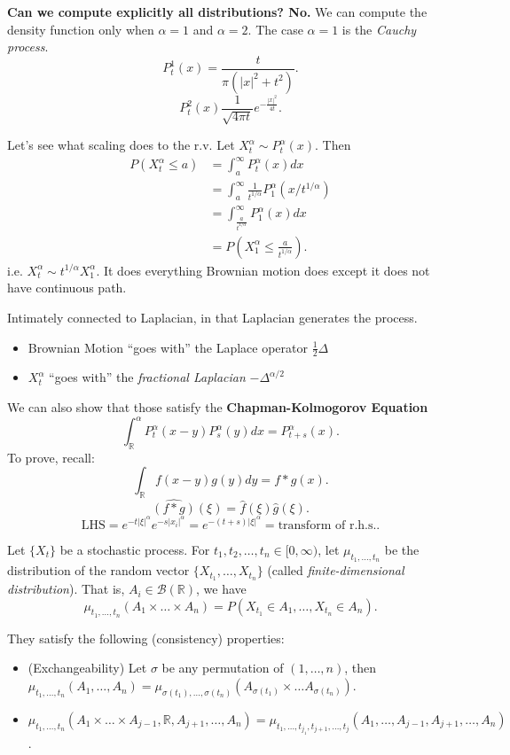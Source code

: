 \textbf{Can we compute explicitly all distributions? No.} We can compute the density function only when $\alpha = 1$ and $\alpha = 2$. The case $\alpha = 1$ is the \textit{Cauchy process}.
\[
	P_t^1 (x) = \frac{t}{\pi (|x|^2 + t^2)}
.\] 
\[
	P_t^2 (x) \frac{1}{\sqrt{4 \pi t} } e^{- \frac{|x|^2}{ 4 t}}
.\] 

Let's see what scaling does to the r.v.
Let $X_t^\alpha \sim P_t^\alpha(x)$. Then
\begin{align*}
	P\left( X_t^\alpha \le a \right) 
	&= \int_a^\infty P_t^\alpha(x) dx \\
	&= \int _a^\infty \frac{1}{t^{1 / \alpha}} P_1^\alpha \left( x / t^{1 / \alpha} \right)  \\
	&= \int _{\frac{a}{t^{1 / \alpha}}}^\infty P_1^\alpha (x) dx \\
	&= P(X_1^\alpha \le  \frac{a}{t^{1 / \alpha}})
.\end{align*}
i.e. $X_t^\alpha \sim t^{1 / \alpha} X_1^\alpha$. It does everything Brownian motion does except it does not have continuous path. 

Intimately connected to Laplacian, in that Laplacian generates the process.
\begin{itemize}
	\item Brownian Motion ``goes with'' the Laplace operator $\frac{1}{2} \Delta$
	\item $X_t^\alpha$ ``goes with'' the \textit{fractional Laplacian} $- \Delta^{\alpha / 2}$
\end{itemize}

We can also show that those satisfy the \textbf{Chapman-Kolmogorov Equation}
\[
	\int _{\mathbb{R}}^\alpha P_t^\alpha(x - y) P_{s}^\alpha(y) dx
	= P_{t + s}^{\alpha} (x)
.\] 
To prove, recall:
\[
	\int _{\mathbb{R}} f(x - y) g(y) dy = f * g(x)
.\] 
\[
	\widehat{ (f * g)}(\xi) = \hat{f} (\xi) \hat{g} (\xi)
.\] 
\[
	\text{LHS} = e^{- t |\xi|^\alpha} e^{- s |x_i|^\alpha} = e^{- (t + s) |\xi|^\alpha} = \text{transform of r.h.s.}
.\] 


Let $\{X_t\} $ be a stochastic process. For $t_1, t_2, \ldots, t_n \in [0,\infty )$, let $\mu_{t_1, \ldots, t_n}$ be the distribution of the random vector $\{X_{t_1}, \ldots, X_{t_n}\} $ (called \textit{finite-dimensional distribution}). That is, $A_i \in \mathcal{B}(\mathbb{R})$, we have
\[
	\mu_{t_1, \ldots, t_n}(A_1 \times \ldots\times A_n)
	= P(X_{t_1} \in A_1, \ldots, X_{t_n} \in A_n)
.\]

They satisfy the following (consistency) properties:

\begin{itemize}
	\item 
(Exchangeability) Let $\sigma$ be any permutation of $(1, \ldots, n)$, then $\mu_{t_1, \ldots, t_n}(A_1, \ldots, A_n) = \mu_{\sigma(t_1), \ldots, \sigma(t_n)}\left( A_{\sigma(t_1)} \times  \ldots A_{\sigma(t_n)} \right) $.
\item $\mu_{t_1, \ldots, t_n}\left( A_1 \times \ldots\times A_{j-1}, \mathbb{R}, A_{j+1}, \ldots, A_{n} \right) = \mu_{t_1, \ldots, t_{j_1}, t_{j+1}, \ldots, t_j}\left( A_1, \ldots, A_{j-1}, A_{j+1}, \ldots, A_n \right)  $.
\end{itemize}

